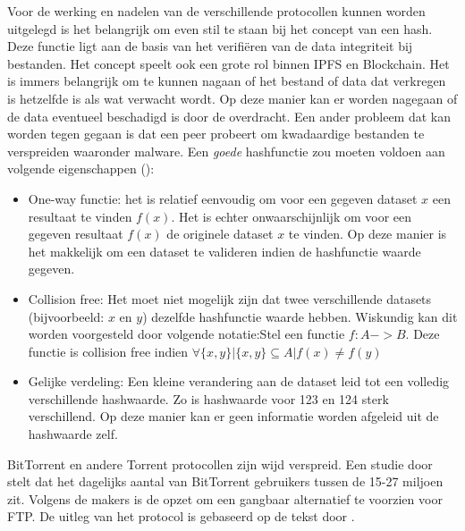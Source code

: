 Voor de werking en nadelen van de verschillende protocollen kunnen worden uitgelegd is het belangrijk om even stil te staan bij het concept van een hash. Deze functie ligt aan de basis van het verifiëren van de data integriteit bij bestanden. Het concept speelt ook een grote rol binnen IPFS en Blockchain. Het is immers belangrijk om te kunnen nagaan of het bestand of data dat verkregen is hetzelfde is als wat verwacht wordt. Op deze manier kan er worden nagegaan of de data eventueel beschadigd is door de overdracht. Een ander probleem dat kan worden tegen gegaan is dat een peer probeert om kwadaardige bestanden te verspreiden waaronder malware. Een \textit{goede} hashfunctie zou moeten voldoen aan volgende eigenschappen (\autocite{Anderson93}):

\begin{itemize}
\item One-way functie: het is relatief eenvoudig om voor een gegeven dataset $x$ een resultaat te vinden $f(x)$. Het is echter onwaarschijnlijk om voor een gegeven resultaat $f(x)$ de originele dataset $x$ te vinden. Op deze manier is het makkelijk om een dataset te valideren indien de hashfunctie waarde gegeven.\\
\item Collision free: Het moet niet mogelijk zijn dat twee verschillende datasets (bijvoorbeeld: $x$ en $y$) dezelfde hashfunctie waarde hebben. Wiskundig kan dit worden voorgesteld door volgende notatie:Stel een functie $f:A->B$. Deze functie is collision free indien $\forall \{x,y\}|\{x,y\} \subseteq A | f(x) \neq f(y)$
\item Gelijke verdeling: Een kleine verandering aan de dataset leid tot een volledig verschillende hashwaarde. Zo is hashwaarde voor 123 en 124 sterk verschillend. Op deze manier kan er geen informatie worden afgeleid uit de hashwaarde zelf.
\end{itemize}
 
BitTorrent en andere Torrent protocollen zijn wijd verspreid. Een studie door \textcite{Wang2013} stelt dat het dagelijks aantal van BitTorrent gebruikers tussen de 15-27 miljoen zit. Volgens de makers is de opzet om een gangbaar alternatief te voorzien voor FTP. De uitleg van het protocol is gebaseerd op de tekst door \textcite{Fonseca2005}.

